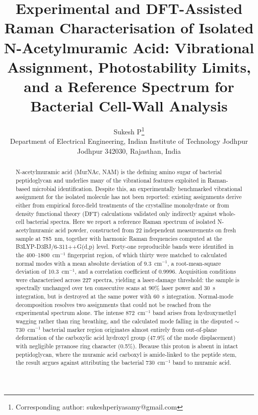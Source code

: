 \documentclass[11pt,a4paper]{article}
\newcommand{\wn}{\ensuremath{\mathrm{cm}^{-1}}}
\begin{document}
\title{Experimental and DFT-Assisted Raman Characterisation of Isolated
N-Acetylmuramic Acid: Vibrational Assignment, Photostability Limits, and a
Reference Spectrum for Bacterial Cell-Wall Analysis}

\author{Sukesh P\thanks{Corresponding author: sukeshperiyasamy@gmail.com}\\[2pt]
\small Department of Electrical Engineering, Indian Institute of Technology Jodhpur\\
\small Jodhpur 342030, Rajasthan, India}
\date{}
\maketitle






\begin{abstract}
N-acetylmuramic acid (MurNAc, NAM) is the defining amino sugar of bacterial
peptidoglycan and underlies many of the vibrational features exploited in
Raman-based microbial identification. Despite this, an experimentally
benchmarked vibrational assignment for the isolated molecule has not been
reported: existing assignments derive either from empirical force-field
treatments of the crystalline monohydrate or from density functional theory
(DFT) calculations validated only indirectly against whole-cell bacterial
spectra. Here we report a reference Raman spectrum of isolated N-acetylmuramic
acid powder, constructed from 22 independent measurements on fresh sample at
785~nm, together with harmonic Raman frequencies computed at the
B3LYP-D3BJ/6-311++G(d,p) level. Forty-one reproducible bands were identified in
the 400--1800~\wn{} fingerprint region, of which thirty were matched to
calculated normal modes with a mean absolute deviation of 9.3~\wn{}, a
root-mean-square deviation of 10.3~\wn{}, and a correlation coefficient of
0.9996. Acquisition conditions were characterised across 227 spectra, yielding a
laser-damage threshold: the sample is spectrally unchanged over ten consecutive
scans at 90\% laser power and 30~s integration, but is destroyed at the same
power with 60~s integration. Normal-mode decomposition resolves two assignments
that could not be reached from the experimental spectrum alone. The intense
872~\wn{} band arises from hydroxymethyl wagging rather than ring breathing, and
the calculated mode falling in the disputed $\sim$730~\wn{} bacterial marker
region originates almost entirely from out-of-plane deformation of the
carboxylic acid hydroxyl group (47.9\% of the mode displacement) with negligible
pyranose ring character (0.5\%). Because this proton is absent in intact
peptidoglycan, where the muramic acid carboxyl is amide-linked to the peptide
stem, the result argues against attributing the bacterial 730~\wn{} band to
muramic acid.
\end{abstract}
\end{document}
